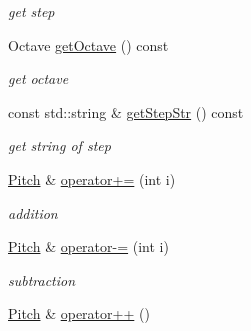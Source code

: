 \begin{DoxyCompactItemize}
\begin{DoxyCompactList}\small\item\em get step \end{DoxyCompactList}\item 
\hypertarget{classsinsy_1_1Pitch_afc01f8edefa2c3ce9d48d08d028546d3}{\-Octave \hyperlink{classsinsy_1_1Pitch_afc01f8edefa2c3ce9d48d08d028546d3}{get\-Octave} () const }\label{classsinsy_1_1Pitch_afc01f8edefa2c3ce9d48d08d028546d3}

\begin{DoxyCompactList}\small\item\em get octave \end{DoxyCompactList}\item 
\hypertarget{classsinsy_1_1Pitch_a68f5d2c2c2160956fbee56a865c9b67c}{const std\-::string \& \hyperlink{classsinsy_1_1Pitch_a68f5d2c2c2160956fbee56a865c9b67c}{get\-Step\-Str} () const }\label{classsinsy_1_1Pitch_a68f5d2c2c2160956fbee56a865c9b67c}

\begin{DoxyCompactList}\small\item\em get string of step \end{DoxyCompactList}\item 
\hypertarget{classsinsy_1_1Pitch_a7a3cb44d64a0891b855675853988e78a}{\hyperlink{classsinsy_1_1Pitch}{\-Pitch} \& \hyperlink{classsinsy_1_1Pitch_a7a3cb44d64a0891b855675853988e78a}{operator+=} (int i)}\label{classsinsy_1_1Pitch_a7a3cb44d64a0891b855675853988e78a}

\begin{DoxyCompactList}\small\item\em addition \end{DoxyCompactList}\item 
\hypertarget{classsinsy_1_1Pitch_a379fabbc21fa642325ba05abe6050ab9}{\hyperlink{classsinsy_1_1Pitch}{\-Pitch} \& \hyperlink{classsinsy_1_1Pitch_a379fabbc21fa642325ba05abe6050ab9}{operator-\/=} (int i)}\label{classsinsy_1_1Pitch_a379fabbc21fa642325ba05abe6050ab9}

\begin{DoxyCompactList}\small\item\em subtraction \end{DoxyCompactList}\item 
\hypertarget{classsinsy_1_1Pitch_a7316948d08c9582f4d3bf4ea43c8854a}{\hyperlink{classsinsy_1_1Pitch}{\-Pitch} \& \hyperlink{classsinsy_1_1Pitch_a7316948d08c9582f4d3bf4ea43c8854a}{operator++} ()}\label{classsinsy_1_1Pitch_a7316948d08c9582f4d3bf4ea43c8854a}


\end{DoxyCompactItemize}
